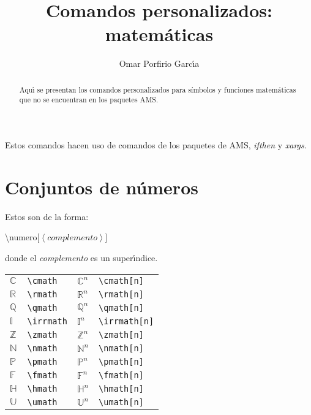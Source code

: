 \documentclass[10pt, a4paper]{article}
\title{Comandos personalizados: matem\'{a}ticas}
\author{Omar Porfirio Garc\'{\i}a}
\newcommand{\cmath}[1][]{\mathbb{C}^{#1}}
\newcommand{\rmath}[1][]{\mathbb{R}^{#1}}
\newcommand{\qmath}[1][]{\mathbb{Q}^{#1}}
\newcommand{\irrmath}[1][]{\mathbb{I}^{#1}}
\newcommand{\zmath}[1][]{\mathbb{Z}^{#1}}
\newcommand{\nmath}[1][]{\mathbb{N}^{#1}}
\newcommand{\pmath}[1][]{\mathbb{P}^{#1}}
\newcommand{\fmath}[1][]{\mathbb{F}^{#1}}
\newcommand{\hmath}[1][]{\mathbb{H}^{#1}}
\newcommand{\umath}[1][]{\mathbb{U}^{#1}}
\newcommand{\inprod}[1]{\left\langle #1 \right\rangle}
\begin{document}
\maketitle

\begin{abstract}
Aqu\'{\i} se presentan los comandos personalizados para símbolos y funciones matemáticas que no se encuentran en los paquetes AMS.
\end{abstract}
Estos comandos hacen uso de comandos de los paquetes de AMS, \emph{ifthen} y \emph{xargs}.
\section{Conjuntos de n\'{u}meros}
Estos son de la forma:
\begin{center}
	\ttfamily
	\textbackslash numero[$ \inprod{complemento} $]
\end{center}
donde el \emph{complemento} es un super\'{\i}ndice.
\begin{center}
	\begin{tabular}{ll|ll}
		$ \cmath $ & \texttt{\textbackslash cmath} & $ \cmath[n] $ & \texttt{\textbackslash cmath[n]} \\
		$ \rmath $ & \texttt{\textbackslash rmath} & $ \rmath[n] $ & \texttt{\textbackslash rmath[n]}\\
		$ \qmath $ & \texttt{\textbackslash qmath} & $ \qmath[n] $ & \texttt{\textbackslash qmath[n]}\\
		$ \irrmath $ & \texttt{\textbackslash irrmath} & $ \irrmath[n] $ & \texttt{\textbackslash irrmath[n]}\\
		$ \zmath $ & \texttt{\textbackslash zmath} & $ \zmath[n] $ & \texttt{\textbackslash zmath[n]}\\
		$ \nmath $ & \texttt{\textbackslash nmath} & $ \nmath[n] $ & \texttt{\textbackslash nmath[n]}\\
		$ \pmath $ & \texttt{\textbackslash pmath} & $ \pmath[n] $ & \texttt{\textbackslash pmath[n]}\\
		$ \fmath $ & \texttt{\textbackslash fmath} & $ \fmath[n] $ & \texttt{\textbackslash fmath[n]}\\
		$ \hmath $ & \texttt{\textbackslash hmath} & $ \hmath[n] $ & \texttt{\textbackslash hmath[n]}\\
		$ \umath $ & \texttt{\textbackslash umath} & $ \umath[n] $ & \texttt{\textbackslash umath[n]}
	\end{tabular}
\end{center}
\end{document}
